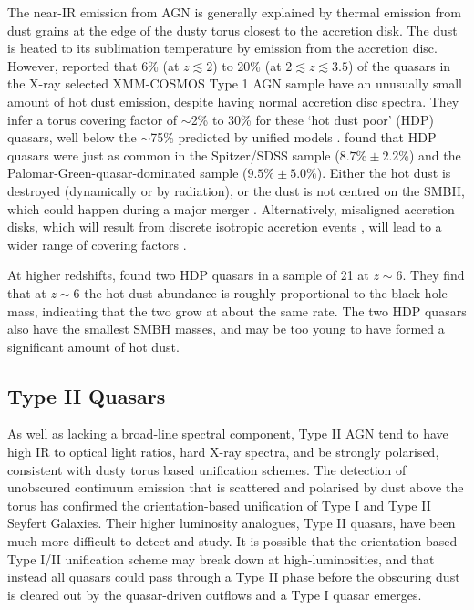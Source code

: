 The near-IR emission from AGN is generally explained by thermal emission from dust grains at the edge of the dusty torus closest to the accretion disk. 
The dust is heated to its sublimation temperature \citep[1300-2000K][]{barvainis92} by emission from the accretion disc. However, \citet{hao10} reported that 6\% (at $z \lesssim 2$) to 20\% (at $2 \lesssim z \lesssim 3.5$) of the quasars in the X-ray selected XMM-COSMOS Type 1 AGN sample \citep{brusa10} have an unusually small amount of hot dust emission, despite having normal accretion disc spectra. 
They infer a torus covering factor of  $\sim$2\% to 30\% for these `hot dust poor' (HDP) quasars, well below the $\sim$75\% predicted by unified models \citep[e.g.][]{krolik88}. 
\citet{hao11} found that HDP quasars were just as common in the \citet{richards06} Spitzer/SDSS sample ($8.7\% \pm 2.2\%$) and the \citet{elvis94} Palomar-Green-quasar-dominated sample ($9.5\% \pm 5.0\%$). 
Either the hot dust is destroyed (dynamically or by radiation), or the dust is not centred on the SMBH, which could happen during a major merger \citep[e.g.][]{blecha11}. 
Alternatively, misaligned accretion disks, which will result from discrete isotropic accretion events \citep{volonteri07}, will lead to a wider range of covering factors \citep{lawrence10}. 

At higher redshifts, \citet{jiang10} found two HDP quasars in a sample of 21 at $z\sim6$. 
They find that at $z\sim6$ the hot dust abundance is roughly proportional to the black hole mass, indicating that the two grow at about the same rate. 
The two HDP quasars also have the smallest SMBH masses, and may be too young to have formed a significant amount of hot dust.

\subsection{Type II Quasars}

As well as lacking a broad-line spectral component, Type II AGN tend to have high IR to optical light ratios, hard X-ray spectra, and be strongly polarised, consistent with dusty torus based unification schemes. 
The detection of unobscured continuum emission that is scattered and polarised by dust above the torus has confirmed the orientation-based unification of Type I and Type II Seyfert Galaxies. 
Their higher luminosity analogues, Type II quasars, have been much more difficult to detect and study. 
It is possible that the orientation-based Type I/II unification scheme may break down at high-luminosities, and that instead all quasars could pass through a Type II phase before the obscuring dust is cleared out by the quasar-driven outflows and a Type I quasar emerges.  

